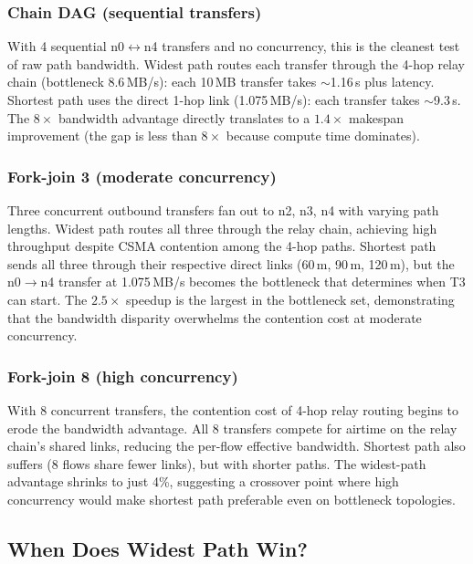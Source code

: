 \documentclass[11pt]{article}
\begin{document}
\subsubsection{Chain DAG (sequential transfers)}

With 4 sequential n0$\leftrightarrow$n4 transfers and no concurrency, this is
the cleanest test of raw path bandwidth. Widest path routes each transfer
through the 4-hop relay chain (bottleneck 8.6\,MB/s): each 10\,MB transfer
takes $\sim$1.16\,s plus latency. Shortest path uses the direct 1-hop link
(1.075\,MB/s): each transfer takes $\sim$9.3\,s. The $8\times$ bandwidth
advantage directly translates to a $1.4\times$ makespan improvement (the gap
is less than $8\times$ because compute time dominates).

\subsubsection{Fork-join 3 (moderate concurrency)}

Three concurrent outbound transfers fan out to n2, n3, n4 with varying path
lengths. Widest path routes all three through the relay chain, achieving high
throughput despite CSMA contention among the 4-hop paths. Shortest path sends
all three through their respective direct links (60\,m, 90\,m, 120\,m), but
the n0$\to$n4 transfer at 1.075\,MB/s becomes the bottleneck that determines
when T3 can start. The $2.5\times$ speedup is the largest in the bottleneck
set, demonstrating that the bandwidth disparity overwhelms the contention cost
at moderate concurrency.

\subsubsection{Fork-join 8 (high concurrency)}

With 8 concurrent transfers, the contention cost of 4-hop relay routing
begins to erode the bandwidth advantage. All 8 transfers compete for airtime
on the relay chain's shared links, reducing the per-flow effective bandwidth.
Shortest path also suffers (8 flows share fewer links), but with shorter
paths. The widest-path advantage shrinks to just 4\%, suggesting a crossover
point where high concurrency would make shortest path preferable even on
bottleneck topologies.

\subsection{When Does Widest Path Win?}
\end{document}
